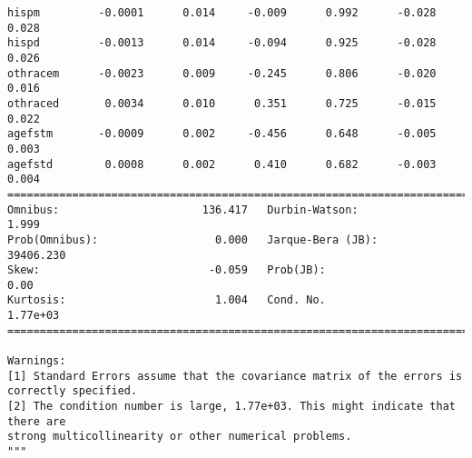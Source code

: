\documentclass[11pt]{article}
\begin{document}
\begin{verbatim}
hispm         -0.0001      0.014     -0.009      0.992      -0.028       0.028
hispd         -0.0013      0.014     -0.094      0.925      -0.028       0.026
othracem      -0.0023      0.009     -0.245      0.806      -0.020       0.016
othraced       0.0034      0.010      0.351      0.725      -0.015       0.022
agefstm       -0.0009      0.002     -0.456      0.648      -0.005       0.003
agefstd        0.0008      0.002      0.410      0.682      -0.003       0.004
==============================================================================
Omnibus:                      136.417   Durbin-Watson:                   1.999
Prob(Omnibus):                  0.000   Jarque-Bera (JB):            39406.230
Skew:                          -0.059   Prob(JB):                         0.00
Kurtosis:                       1.004   Cond. No.                     1.77e+03
==============================================================================

Warnings:
[1] Standard Errors assume that the covariance matrix of the errors is correctly specified.
[2] The condition number is large, 1.77e+03. This might indicate that there are
strong multicollinearity or other numerical problems.
"""
    \end{verbatim}

    
    
\end{document}
